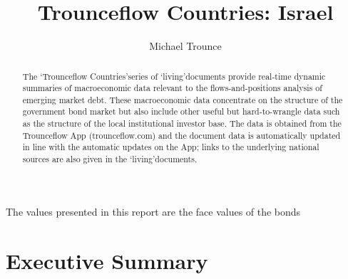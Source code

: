 \documentclass[11pt, oneside]{article}      %
\title{Trounceflow Countries: Israel}
\author{Michael Trounce}
\numberwithin{table}{section}
\begin{document}

\maketitle
\begin{abstract}
   The \lq{Trounceflow Countries}\rq series of \lq{living}\rq documents provide real-time dynamic summaries of macroeconomic data relevant to the flows-and-positions analysis of emerging market
debt. These macroeconomic data concentrate on the structure of the government bond market
but also include other useful but hard-to-wrangle data such as the structure of the local institutional investor base. The data is obtained from the Trounceflow App (trounceflow.com) and
the document data is automatically updated in line with the automatic updates on the App;
links to the underlying national sources are also given in the \lq{living}\rq documents.
\end{abstract}

\begin{center}
\vfill{The values presented in this report are the face values of the bonds}
\end{center}

\pagebreak

\tableofcontents

\pagebreak

\section{Executive Summary}
\end{document}

